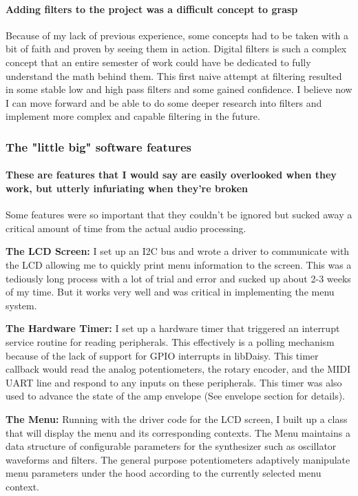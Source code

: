 \documentclass[acmlarge,screen]{acmart}
\begin{document}
	\paragraph{Adding filters to the project was a difficult concept to grasp} Because of my lack of previous experience, some concepts had to be taken with a bit of faith and proven by seeing them in action. Digital filters is such a complex concept that an entire semester of work could have be dedicated to fully understand the math behind them. This first naive attempt at filtering resulted in some stable low and high pass filters and some gained confidence. I believe now I can move forward and be able to do some deeper research into filters and implement more complex and capable filtering in the future.
	
	\clearpage
	
	\subsubsection{The "little big" software features}
	\paragraph{These are features that I would say are easily overlooked when they work, but utterly infuriating when they're broken} Some features were so important that they couldn't be ignored but sucked away a critical amount of time from the actual audio processing.

	\textbf{The LCD Screen:} I set up an I2C bus and wrote a driver to communicate with the LCD allowing me to quickly print menu information to the screen. This was a tediously long process with a lot of trial and error and sucked up about 2-3 weeks of my time. But it works very well and was critical in implementing the menu system.

	\textbf{The Hardware Timer:} I set up a hardware timer that triggered an interrupt service routine for reading peripherals. This effectively is a polling mechanism because of the lack of support for GPIO interrupts in libDaisy. This timer callback would read the analog potentiometers, the rotary encoder, and the MIDI UART line and respond to any inputs on these peripherals. This timer was also used to advance the state of the amp envelope (See envelope section for details).
	
	\textbf{The Menu:} Running with the driver code for the LCD screen, I built up a class that will display the menu and its corresponding contexts. The Menu maintains a data structure of configurable parameters for the synthesizer such as oscillator waveforms and filters. The general purpose potentiometers adaptively manipulate menu parameters under the hood according to the currently selected menu context.
	
\end{document}
